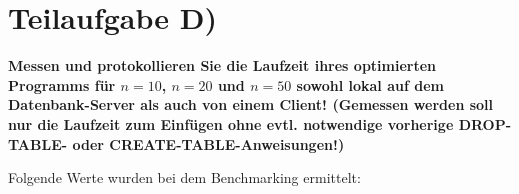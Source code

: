 \section{Teilaufgabe D)}
\textbf{Messen und protokollieren Sie die Laufzeit ihres optimierten Programms
für $n=10$, $n=20$ und $n=50$ sowohl lokal auf dem Datenbank-Server als auch von
einem  Client! (Gemessen werden soll nur die Laufzeit zum Einfügen
ohne evtl. notwendige vorherige DROP-TABLE- oder CREATE-TABLE-Anweisungen!)}

Folgende Werte wurden bei dem Benchmarking ermittelt:

